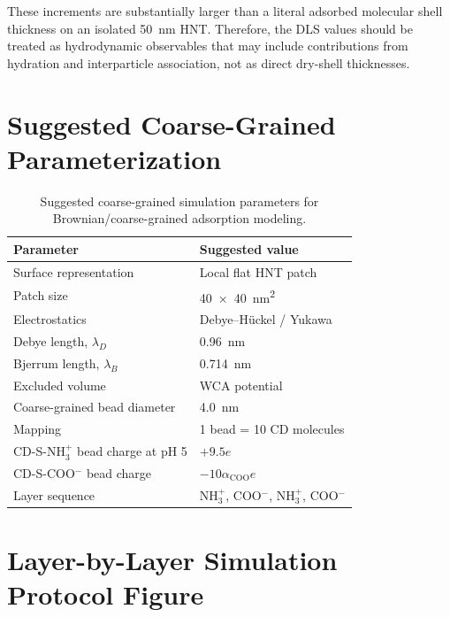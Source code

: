 \documentclass[11pt]{article}
\begin{document}
\noindent
These increments are substantially larger than a literal adsorbed molecular shell thickness on an isolated \SI{50}{nm} HNT. Therefore, the DLS values should be treated as hydrodynamic observables that may include contributions from hydration and interparticle association, not as direct dry-shell thicknesses.

\section{Suggested Coarse-Grained Parameterization}

\begin{table}[H]
\centering
\caption{Suggested coarse-grained simulation parameters for Brownian/coarse-grained adsorption modeling.}
\begin{tabular}{ll}
\toprule
Parameter & Suggested value \\
\midrule
Surface representation & Local flat HNT patch \\
Patch size & \SI{40 x 40}{nm^2} \\
Electrostatics & Debye--H\"uckel / Yukawa \\
Debye length, $\lambda_D$ & \SI{0.96}{nm} \\
Bjerrum length, $\lambda_B$ & \SI{0.714}{nm} \\
Excluded volume & WCA potential \\
Coarse-grained bead diameter & \SI{4.0}{nm} \\
Mapping & 1 bead = 10 CD molecules \\
CD-S-NH$_3^+$ bead charge at pH 5 & $+9.5e$ \\
CD-S-COO$^-$ bead charge & $-10\alpha_{\mathrm{COO}}e$ \\
Layer sequence & NH$_3^+$, COO$^-$, NH$_3^+$, COO$^-$ \\
\bottomrule
\end{tabular}
\label{tab:cg_params}
\end{table}

\section{Layer-by-Layer Simulation Protocol Figure}
\end{document}
